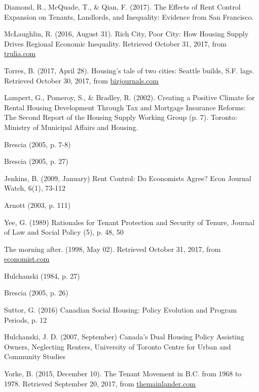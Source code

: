 \begin{thebibliography}{9}
   Diamond, R., McQuade, T., \& Qian, F. (2017). The Effects of Rent Control Expansion on Tenants, Landlords, and Inequality: Evidence from San Francisco.

  McLaughlin, R. (2016, August 31). Rich City, Poor City: How Housing Supply Drives Regional Economic Inequality. Retrieved October 31, 2017, from \href{https://www.trulia.com/blog/trends/rich-city-poor-city/}{trulia.com}

  Torres, B. (2017, April 28). Housing’s tale of two cities: Seattle builds, S.F. lags. Retrieved October 30, 2017, from \href{https://www.bizjournals.com/sanfrancisco/news/2017/04/28/san-francisco-seattle-housing-production-pipelines.html}{bizjournals.com}

  Lampert, G., Pomeroy, S., \& Bradley, R. (2002). Creating a Positive Climate for Rental Housing Development Through Tax and Mortgage Insurance Reforms: The Second Report of the Housing Supply Working Group (p. 7). Toronto: Ministry of Municipal Affairs and Housing.

  Brescia (2005, p. 7-8)

   Brescia (2005, p. 27)

  Jenkins, B. (2009, January) Rent Control: Do Economists Agree? Econ Journal Watch, 6(1), 73-112

  Arnott (2003, p. 111)

  Yee, G. (1989) Rationales for Tenant Protection and Security of Tenure, Journal of Law and Social Policy (5), p. 48, 50

  The morning after. (1998, May 02). Retrieved October 31, 2017, from \href{http://www.economist.com/node/161526}{economist.com}

  Hulchanski (1984, p. 27)

  Brescia (2005, p. 26)

  Suttor, G. (2016) Canadian Social Housing: Policy Evolution and Program Periods, p. 12

  Hulchanski, J. D. (2007, September) Canada’s Dual Housing Policy Assisting Owners, Neglecting Renters, University of Toronto Centre for Urban and Community Studies

  Yorke, B. (2015, December 10). The Tenant Movement in B.C. from 1968 to 1978. Retrieved September 20, 2017, from \href{http://themainlander.com/2012/11/09/the-tenant-movement-in-b-c-from-1968-to-1978/}{themainlander.com}


\end{thebibliography}
